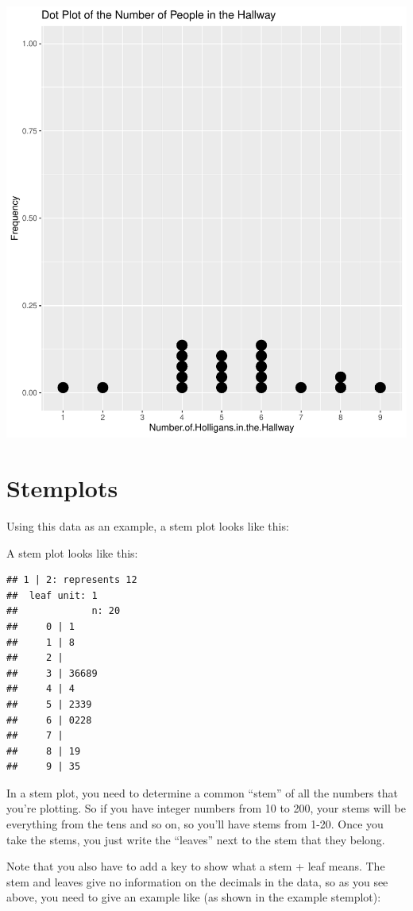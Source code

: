 \documentclass[
]{book}
\theoremstyle{definition}
\theoremstyle{definition}
\theoremstyle{definition}
\theoremstyle{definition}
\theoremstyle{remark}
\begin{document}
\includegraphics{_main_files/figure-latex/unnamed-chunk-16-1.pdf}

\hypertarget{stemplots}{%
\section{Stemplots}\label{stemplots}}

Using this data as an example, a stem plot looks like this:

A stem plot looks like this:

\begin{verbatim}
## 1 | 2: represents 12
##  leaf unit: 1
##             n: 20
##     0 | 1
##     1 | 8
##     2 | 
##     3 | 36689
##     4 | 4
##     5 | 2339
##     6 | 0228
##     7 | 
##     8 | 19
##     9 | 35
\end{verbatim}

In a stem plot, you need to determine a common ``stem'' of all the numbers
that you're plotting. So if you have integer numbers from 10 to 200,
your stems will be everything from the tens and so on, so you'll have
stems from 1-20. Once you take the stems, you just write the ``leaves''
next to the stem that they belong.

Note that you also have to add a key to show what a stem + leaf means.
The stem and leaves give no information on the decimals in the data, so
as you see above, you need to give an example like (as shown in the
example stemplot):
\end{document}
